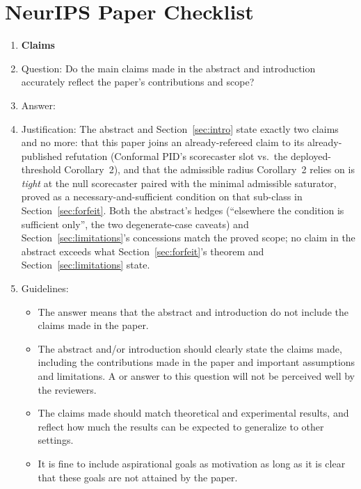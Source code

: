 \section*{NeurIPS Paper Checklist}

\begin{enumerate}

\item {\bf Claims}
    \item[] Question: Do the main claims made in the abstract and introduction accurately reflect the paper's contributions and scope?
    \item[] Answer: \answerYes{}
    \item[] Justification: The abstract and Section~\ref{sec:intro} state exactly two claims and no more: that this paper joins an already-refereed claim to its already-published refutation (Conformal PID's scorecaster slot vs.\ the deployed-threshold Corollary~2), and that the admissible radius Corollary~2 relies on is \emph{tight} at the null scorecaster paired with the minimal admissible saturator, proved as a necessary-and-sufficient condition on that sub-class in Section~\ref{sec:forfeit}. Both the abstract's hedges (``elsewhere the condition is sufficient only'', the two degenerate-case caveats) and Section~\ref{sec:limitations}'s concessions match the proved scope; no claim in the abstract exceeds what Section~\ref{sec:forfeit}'s theorem and Section~\ref{sec:limitations} state.
    \item[] Guidelines:
    \begin{itemize}
        \item The answer \answerNA{} means that the abstract and introduction do not include the claims made in the paper.
        \item The abstract and/or introduction should clearly state the claims made, including the contributions made in the paper and important assumptions and limitations. A \answerNo{} or \answerNA{} answer to this question will not be perceived well by the reviewers.
        \item The claims made should match theoretical and experimental results, and reflect how much the results can be expected to generalize to other settings.
        \item It is fine to include aspirational goals as motivation as long as it is clear that these goals are not attained by the paper.
    \end{itemize}


\end{enumerate}
